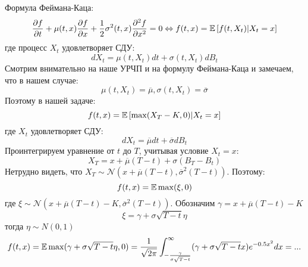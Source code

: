 \documentclass[12pt]{article}
\begin{document}
Формула Феймана-Каца:
$$
    \dfrac{\partial f}{\partial t} + \mu(t, x) \dfrac{\partial f}{\partial x}
    + \dfrac{1}{2}\sigma^2(t, x) \dfrac{\partial^2 f}{\partial x^2} = 0 \Leftrightarrow f(t, x) = \mathbb{E} \left[ f(t, X_t) | X_t = x \right]
$$где процесс $X_t$ удовлетворяет СДУ:
$$
    dX_t = \mu(t, X_t) dt + \sigma(t, X_t) dB_t
$$
Смотрим внимательно на наше УРЧП и на формулу Феймана-Каца и замечаем, что в нашем случае:
$$
    \mu(t, X_t) = \overline{\mu}, \sigma(t, X_t) = \overline{\sigma}
$$Поэтому в нашей задаче:
$$
    f(t, x) = \mathbb{E} \left[ \max(X_T - K, 0) | X_t = x \right]
$$где $X_t$ удовлетворяет СДУ:
$$
    dX_t = \overline{\mu} dt + \overline{\sigma} dB_t
$$Проинтегрируем уравнение от $t$ до $T$, учитывая условие $X_t = x$:
$$
    X_T = x + \overline{\mu} (T - t) + \sigma (B_T - B_t)
$$Нетрудно видеть, что $X_T \sim \mathcal{N}\left( x + \overline{\mu} (T - t), \overline{\sigma}^2 (T-t) \right)$. Поэтому:
$$
    f(t, x) = \mathbb{E} \max(\xi, 0)
$$где $\xi \sim \mathcal{N}\left( x + \overline{\mu} (T - t) - K, \overline{\sigma}^2 (T-t) \right)$. Обозначим $\gamma = x + \overline{\mu} (T - t) - K$ 
$$
    \xi = \gamma + \sigma \sqrt{T-t} \eta
$$тогда $\eta \sim N(0, 1)$
$$
    f(t, x) = \mathbb{E} \max(\gamma + \sigma \sqrt{T-t} \eta, 0) = 
    \dfrac{1}{\sqrt{2\pi}} \int_{-\frac{\gamma}{\sigma \sqrt{T-t}}}^{\infty} (\gamma + \sigma \sqrt{T-t} x) e^{-0.5 x^2}dx = ...
$$
\end{document}
